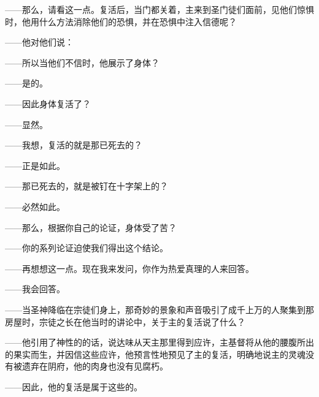 ——那么，请看这一点。复活后，当门都关着，主来到圣门徒们面前，见他们惊惧时，他用什么方法消除他们的恐惧，并在恐惧中注入信德呢？\par

——他对他们说：\par

——所以当他们不信时，他展示了身体？\par

——是的。\par

——因此身体复活了？\par

——显然。\par

——我想，复活的就是那已死去的？\par

——正是如此。\par

——那已死去的，就是被钉在十字架上的？\par

——必然如此。\par

——那么，根据你自己的论证，身体受了苦？\par

——你的系列论证迫使我们得出这个结论。\par

——再想想这一点。现在我来发问，你作为热爱真理的人来回答。\par

——我会回答。\par

——当圣神降临在宗徒们身上，那奇妙的景象和声音吸引了成千上万的人聚集到那房屋时，宗徒之长在他当时的讲论中，关于主的复活说了什么？\par

——他引用了神性的的话，说达味从天主那里得到应许，主基督将从他的腰腹所出的果实而生，并因信这些应许，他预言性地预见了主的复活，明确地说主的灵魂没有被遗弃在阴府，他的肉身也没有见腐朽。\par

——因此，他的复活是属于这些的。\par


